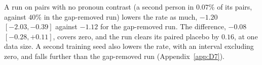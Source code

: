A run on pairs with no pronoun contrast (a second person in $0.07\%$ of its pairs, against $40\%$ in the gap-removed run) lowers the rate as much, $-1.20$ $[-2.03,-0.39]$ against $-1.12$ for the gap-removed run. The difference, $-0.08$ $[-0.28,+0.11]$, covers zero, and the run clears its paired placebo by $0.16$, at one data size. A second training seed also lowers the rate, with an interval excluding zero, and falls further than the gap-removed run (Appendix~\ref{app:D7}).
